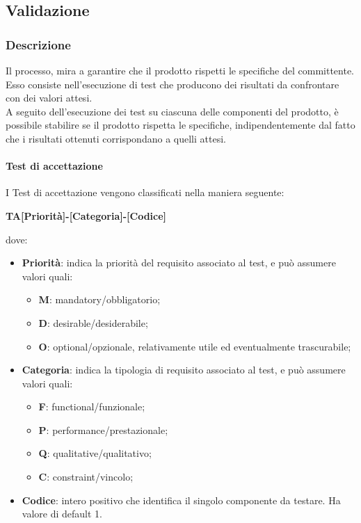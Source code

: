 		\subsection{Validazione}
		\subsubsection{Descrizione}
		Il processo, mira a garantire che il prodotto rispetti le specifiche del committente. Esso consiste nell'esecuzione di test che producono dei risultati da confrontare con dei valori attesi.
		\\
		A seguito dell'esecuzione dei test su ciascuna delle componenti del prodotto, è possibile stabilire se il prodotto rispetta le specifiche, indipendentemente dal fatto che i risultati ottenuti corrispondano a quelli attesi.
	
		
		\paragraph{Test di accettazione}
		I Test di accettazione vengono classificati nella maniera seguente:
		\begin{center}
			\textbf{TA[Priorità]-[Categoria]-[Codice]}
		\end{center}		 
		dove:\\
		\begin{itemize}
			\item \textbf{Priorità}: indica la priorità del requisito associato al test, e può assumere valori quali:
			\begin{itemize}
				\item \textbf{M}: mandatory/obbligatorio;
				\item \textbf{D}: desirable/desiderabile;
				\item \textbf{O}: optional/opzionale, relativamente utile ed eventualmente trascurabile;
			\end{itemize}
			\item \textbf{Categoria}: indica la tipologia di requisito associato al test, e può assumere valori quali:
			\begin{itemize}
				\item \textbf{F}: functional/funzionale;
				\item \textbf{P}: performance/prestazionale;
				\item \textbf{Q}: qualitative/qualitativo;
				\item \textbf{C}: constraint/vincolo;
			\end{itemize}
			\item \textbf{Codice}: intero positivo che identifica il singolo componente da testare. Ha valore di default 1.
		\end{itemize}